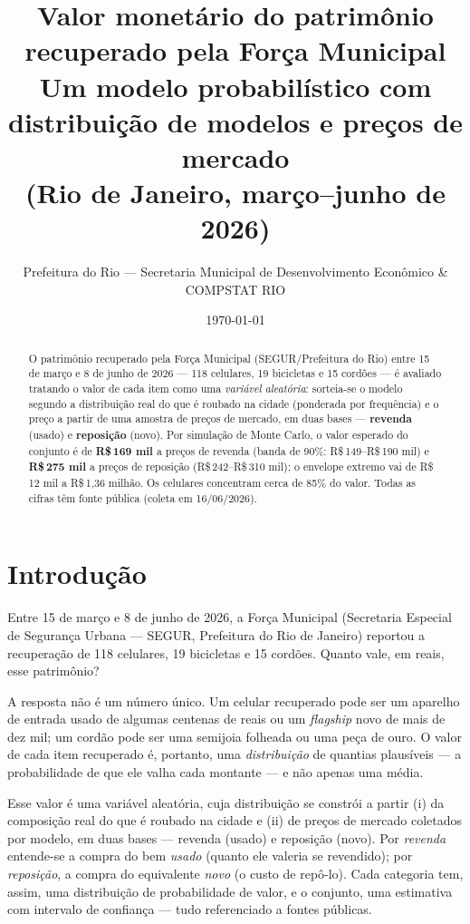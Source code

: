 \documentclass[11pt,a4paper]{article}
\title{\textbf{Valor monetário do patrimônio recuperado pela Força Municipal}\\[0.3em]
\large Um modelo probabilístico com distribuição de modelos e preços de mercado\\(Rio de Janeiro, março--junho de 2026)}
\author{Prefeitura do Rio --- Secretaria Municipal de Desenvolvimento Econômico \& COMPSTAT RIO}
\date{\today}
\newcommand{\reais}[1]{R\$\,#1}
\begin{document}
\maketitle

\begin{abstract}
\noindent O patrimônio recuperado pela Força Municipal (SEGUR/Prefeitura do Rio) entre 15 de março e
8 de junho de 2026 --- 118 celulares, 19 bicicletas e 15 cordões --- é avaliado tratando o valor de
cada item como uma \emph{variável aleatória}: sorteia-se o modelo segundo a distribuição real do que
é roubado na cidade (ponderada por frequência) e o preço a partir de uma amostra de preços de
mercado, em duas bases --- \textbf{revenda} (usado) e \textbf{reposição} (novo). Por simulação de
Monte Carlo, o valor esperado do conjunto é de \textbf{\reais{169} mil} a preços de revenda (banda
de 90\%: \reais{149}--\reais{190} mil) e \textbf{\reais{275} mil} a preços de reposição
(\reais{242}--\reais{310} mil); o envelope extremo vai de \reais{12} mil a \reais{1{,}36} milhão.
Os celulares concentram cerca de 85\% do valor. Todas as cifras têm fonte pública (coleta em
16/06/2026).
\end{abstract}

\section{Introdução}
Entre 15 de março e 8 de junho de 2026, a Força Municipal (Secretaria Especial de Segurança
Urbana --- SEGUR, Prefeitura do Rio de Janeiro) reportou a recuperação de 118 celulares, 19
bicicletas e 15 cordões. Quanto vale, em reais, esse patrimônio?

A resposta não é um número único. Um celular recuperado pode ser um aparelho de entrada usado de
algumas centenas de reais ou um \emph{flagship} novo de mais de dez mil; um cordão pode ser uma
semijoia folheada ou uma peça de ouro. O valor de cada item recuperado é, portanto, uma
\emph{distribuição} de quantias plausíveis --- a probabilidade de que ele valha cada montante ---
e não apenas uma média.

Esse valor é uma variável aleatória, cuja distribuição se constrói a partir (i) da composição real
do que é roubado na cidade e (ii) de preços de mercado coletados por modelo, em duas bases ---
revenda (usado) e reposição (novo). Por \emph{revenda} entende-se a compra do bem \emph{usado}
(quanto ele valeria se revendido); por \emph{reposição}, a compra do equivalente \emph{novo} (o
custo de repô-lo). Cada categoria tem, assim, uma distribuição de probabilidade de valor, e o
conjunto, uma estimativa com intervalo de confiança --- tudo referenciado a fontes públicas.
\end{document}
